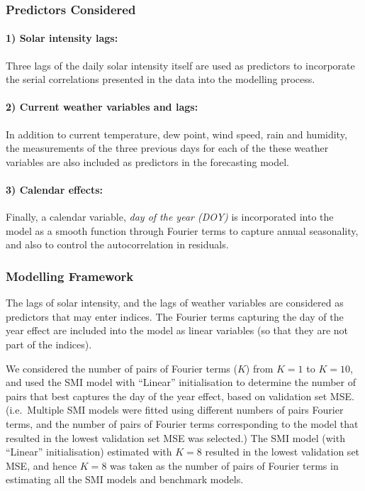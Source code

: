 \documentclass[
  11pt,
  a4paper,
]{article}
\begin{document}
\subsubsection{Predictors Considered}\label{predictors-considered-1}

\paragraph{1) Solar intensity lags:}\label{solar-intensity-lags}

Three lags of the daily solar intensity itself are used as predictors to
incorporate the serial correlations presented in the data into the
modelling process.

\paragraph{2) Current weather variables and
lags:}\label{current-weather-variables-and-lags}

In addition to current temperature, dew point, wind speed, rain and
humidity, the measurements of the three previous days for each of the
these weather variables are also included as predictors in the
forecasting model.

\paragraph{3) Calendar effects:}\label{calendar-effects-1}

Finally, a calendar variable, \emph{day of the year (DOY)} is
incorporated into the model as a smooth function through Fourier terms
to capture annual seasonality, and also to control the autocorrelation
in residuals.

\subsubsection{Modelling Framework}\label{modelling-framework-1}

The lags of solar intensity, and the lags of weather variables are
considered as predictors that may enter indices. The Fourier terms
capturing the day of the year effect are included into the model as
linear variables (so that they are not part of the indices).

We considered the number of pairs of Fourier terms (\(K\)) from
\(K = 1\) to \(K = 10\), and used the SMI model with ``Linear''
initialisation to determine the number of pairs that best captures the
day of the year effect, based on validation set MSE. (i.e.~Multiple SMI
models were fitted using different numbers of pairs Fourier terms, and
the number of pairs of Fourier terms corresponding to the model that
resulted in the lowest validation set MSE was selected.) The SMI model
(with ``Linear'' initialisation) estimated with \(K = 8\) resulted in
the lowest validation set MSE, and hence \(K = 8\) was taken as the
number of pairs of Fourier terms in estimating all the SMI models and
benchmark models.
\end{document}
